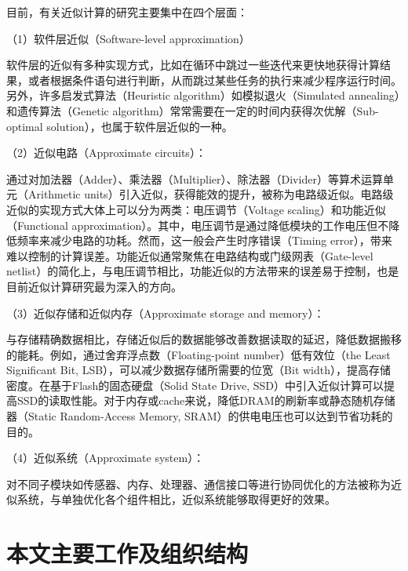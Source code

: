 目前，有关近似计算的研究主要集中在四个层面：

（1）软件层近似（Software-level approximation）

软件层的近似有多种实现方式，比如在循环中跳过一些迭代来更快地获得计算结果，或者根据条件语句进行判断，从而跳过某些任务的执行来减少程序运行时间。另外，许多启发式算法（Heuristic algorithm）如模拟退火（Simulated annealing）和遗传算法（Genetic algorithm）常常需要在一定的时间内获得次优解（Sub-optimal solution），也属于软件层近似的一种。

（2）近似电路（Approximate circuits）：

通过对加法器（Adder）\cite{AC:Aadd:simple_yet}、乘法器（Multiplier）\cite{AC:AM:Adapt}、除法器（Divider）\cite{AC:Div:2019dac}等算术运算单元（Arithmetic units）引入近似，获得能效的提升，被称为电路级近似。电路级近似的实现方式大体上可以分为两类：电压调节（Voltage scaling）和功能近似（Functional approximation）\cite{AC:ALS:survey}。其中，电压调节是通过降低模块的工作电压但不降低频率来减少电路的功耗。然而，这一般会产生时序错误（Timing error），带来难以控制的计算误差\cite{AC:Arith:overscale}。功能近似通常聚焦在电路结构或门级网表（Gate-level netlist）的简化上，与电压调节相比，功能近似的方法带来的误差易于控制，也是目前近似计算研究最为深入的方向\cite{AC:Arith:survey_hanjie}。

（3）近似存储和近似内存（Approximate storage and memory）：

与存储精确数据相比，存储近似后的数据能够改善数据读取的延迟，降低数据搬移的能耗。例如，通过舍弃浮点数（Floating-point number）低有效位（the Least Significant Bit, LSB），可以减少数据存储所需要的位宽（Bit width），提高存储密度。在基于Flash的固态硬盘（Solid State Drive, SSD）中引入近似计算可以提高SSD的读取性能\cite{AC:Store:ASCache}。对于内存或cache来说，降低DRAM的刷新率\cite{AC:Store:DRAM}或静态随机存储器（Static Random-Access Memory, SRAM）\cite{AC:Store:SRAM}的供电电压也可以达到节省功耗的目的。

（4）近似系统（Approximate system）：

对不同子模块如传感器、内存、处理器、通信接口等进行协同优化的方法被称为近似系统，与单独优化各个组件相比，近似系统能够取得更好的效果\cite{AC:Sys:camera}。




\section{本文主要工作及组织结构}

